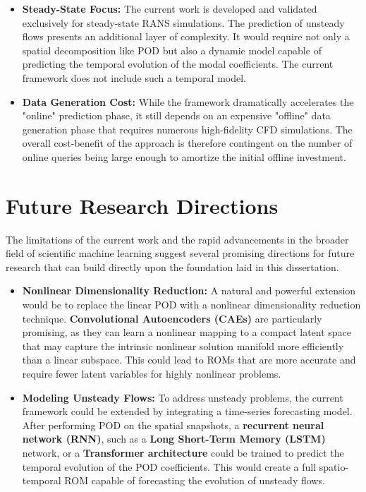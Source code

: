 \documentclass[dsc, EN]{ufabcFHZh}
\begin{document}
{\begin{itemize}
    \item \textbf{Steady-State Focus:} The current work is developed and validated exclusively for steady-state RANS simulations. The prediction of unsteady flows presents an additional layer of complexity. It would require not only a spatial decomposition like POD but also a dynamic model capable of predicting the temporal evolution of the modal coefficients. The current framework does not include such a temporal model.

    \item \textbf{Data Generation Cost:} While the framework dramatically accelerates the "online" prediction phase, it still depends on an expensive "offline" data generation phase that requires numerous high-fidelity CFD simulations. The overall cost-benefit of the approach is therefore contingent on the number of online queries being large enough to amortize the initial offline investment.
\end{itemize}

\section{Future Research Directions}

The limitations of the current work and the rapid advancements in the broader field of scientific machine learning suggest several promising directions for future research that can build directly upon the foundation laid in this dissertation.

\begin{itemize}
    \item \textbf{Nonlinear Dimensionality Reduction:} A natural and powerful extension would be to replace the linear POD with a nonlinear dimensionality reduction technique. \textbf{Convolutional Autoencoders (CAEs)} are particularly promising, as they can learn a nonlinear mapping to a compact latent space that may capture the intrinsic nonlinear solution manifold more efficiently than a linear subspace. This could lead to ROMs that are more accurate and require fewer latent variables for highly nonlinear problems.

    \item \textbf{Modeling Unsteady Flows:} To address unsteady problems, the current framework could be extended by integrating a time-series forecasting model. After performing POD on the spatial snapshots, a \textbf{recurrent neural network (RNN)}, such as a \textbf{Long Short-Term Memory (LSTM)} network, or a \textbf{Transformer architecture} could be trained to predict the temporal evolution of the POD coefficients. This would create a full spatio-temporal ROM capable of forecasting the evolution of unsteady flows.


\end{itemize}}
\end{document}
